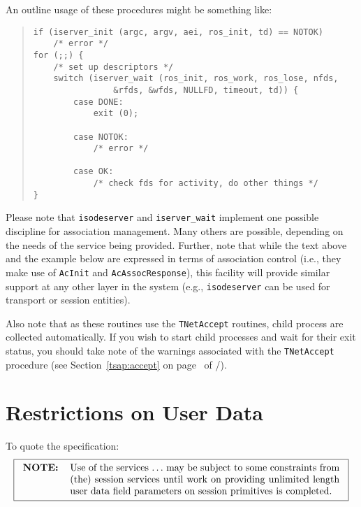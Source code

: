 An outline usage of these procedures might be something like:
\begin{quote}\small\begin{verbatim}
if (iserver_init (argc, argv, aei, ros_init, td) == NOTOK)
    /* error */
for (;;) {
    /* set up descriptors */
    switch (iserver_wait (ros_init, ros_work, ros_lose, nfds,
                &rfds, &wfds, NULLFD, timeout, td)) {
        case DONE:
            exit (0);

        case NOTOK:
            /* error */

        case OK:
            /* check fds for activity, do other things */
}
\end{verbatim}\end{quote}

Please note that \verb"isodeserver" and \verb|iserver_wait| implement
one possible discipline for association management.  Many others are
possible, depending on the needs of the service being provided.
Further, note that while the text above and the example below are
expressed in terms of association control (i.e., they make use of
\verb"AcInit" and \verb"AcAssocResponse"), this facility will provide
similar support at any other layer in the system (e.g.,
\verb"isodeserver" can be used for transport or session entities).

Also note that as these routines use the \verb|TNetAccept| routines,
child process are collected automatically. If you wish to start child
processes and wait for their exit status, you should take note of the
warnings associated with the \verb|TNetAccept| procedure (see
Section~\ref{tsap:accept} on page~\pageref{tsap:accept} of \voltwo/).

\section	{Restrictions on User Data}\label{AcSAPdata}
To quote the \cite{ISO.ACS.Service} specification:
\[\fbox{\begin{tabular}{lp{0.8\textwidth}}
\bf NOTE:&	Use of the services $\ldots$ may be subject to some
		constraints from (the) session services until work on
		providing unlimited length user data field parameters 
		on session primitives is completed.
\end{tabular}}\]

